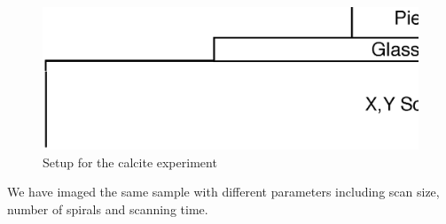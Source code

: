 \begin{figure}[H]
  \centering
  \includegraphics[scale=0.4]{images/calcitesetup.eps}
    \caption{Setup for the calcite experiment}
  \label{fig:calcitesetup}
\end{figure}

We have imaged the same sample with different parameters including scan size, number of spirals and scanning time.



